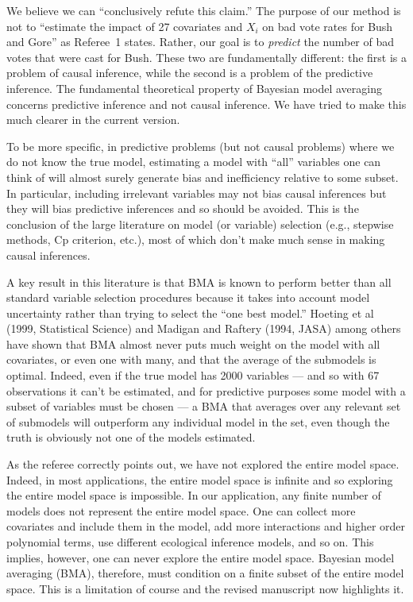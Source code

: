 \documentclass[11pt]{article}
\begin{document}
\begin{enumerate}
  We believe we can ``conclusively refute this claim.''  The purpose
  of our method is not to ``estimate the impact of 27 covariates and
  $X_i$ on bad vote rates for Bush and Gore'' as Referee~1 states.
  Rather, our goal is to \emph{predict} the number of bad votes that
  were cast for Bush. These two are fundamentally different: the first
  is a problem of causal inference, while the second is a problem of
  the predictive inference. The fundamental theoretical property of
  Bayesian model averaging concerns predictive inference and not
  causal inference.  We have tried to make this much clearer in the
  current version.
  
  To be more specific, in predictive problems (but not causal
  problems) where we do not know the true model, estimating a model
  with ``all'' variables one can think of will almost surely generate
  bias and inefficiency relative to some subset.  In particular,
  including irrelevant variables may not bias causal inferences but
  they will bias predictive inferences and so should be avoided.  This
  is the conclusion of the large literature on model (or variable)
  selection (e.g., stepwise methods, Cp criterion, etc.), most of
  which don't make much sense in making causal inferences.
  
  A key result in this literature is that BMA is known to perform
  better than all standard variable selection procedures because it
  takes into account model uncertainty rather than trying to select
  the ``one best model.''  Hoeting et al (1999, Statistical Science)
  and Madigan and Raftery (1994, JASA) among others have shown that
  BMA almost never puts much weight on the model with all covariates,
  or even one with many, and that the average of the submodels is
  optimal.  Indeed, even if the true model has 2000 variables --- and
  so with 67 observations it can't be estimated, and for predictive
  purposes some model with a subset of variables must be chosen --- a
  BMA that averages over any relevant set of submodels will outperform
  any individual model in the set, even though the truth is obviously
  not one of the models estimated.
  
  As the referee correctly points out, we have not explored the entire
  model space. Indeed, in most applications, the entire model space is
  infinite and so exploring the entire model space is impossible.  In
  our application, any finite number of models does not represent the
  entire model space.  One can collect more covariates and include
  them in the model, add more interactions and higher order polynomial
  terms, use different ecological inference models, and so on.  This
  implies, however, one can never explore the entire model space.
  Bayesian model averaging (BMA), therefore, must condition on a
  finite subset of the entire model space.  This is a limitation of
  course and the revised manuscript now highlights it.
  

\end{enumerate}
\end{document}
